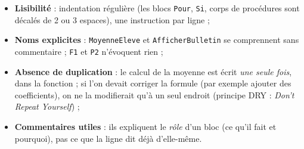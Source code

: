 \documentclass[11pt]{article}
\begin{document}
\begin{itemize}
\item \textbf{Lisibilité} : indentation régulière (les blocs \texttt{Pour}, \texttt{Si}, corps de procédures sont décalés de 2 ou 3 espaces), une instruction par ligne ;
\item \textbf{Noms explicites} : \texttt{MoyenneEleve} et \texttt{AfficherBulletin} se comprennent sans commentaire ; \texttt{F1} et \texttt{P2} n'évoquent rien ;
\item \textbf{Absence de duplication} : le calcul de la moyenne est écrit \emph{une seule fois}, dans la fonction ; si l'on devait corriger la formule (par exemple ajouter des coefficients), on ne la modifierait qu'à un seul endroit (principe DRY : \emph{Don't Repeat Yourself}) ;
\item \textbf{Commentaires utiles} : ils expliquent le \emph{rôle} d'un bloc (ce qu'il fait et pourquoi), pas ce que la ligne dit déjà d'elle-même.
\end{itemize}
\end{document}
